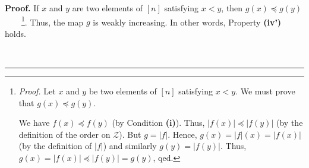 \documentclass[numbers=enddot,12pt,final,onecolumn,notitlepage]{scrartcl}%
\theoremstyle{definition}
\newenvironment{proof}[1][Proof]{\noindent\textbf{#1.} }{\ \rule{0.5em}{0.5em}}
\newenvironment{verlong}{}{}
\begin{document}
\begin{verlong}
\begin{proof}
If $x$ and $y$ are two elements of $\left[  n\right]  $ satisfying $x<y$, then
$g\left(  x\right)  \preccurlyeq g\left(  y\right)  $%
\ \ \ \ \footnote{\textit{Proof.} Let $x$ and $y$ be two elements of $\left[
n\right]  $ satisfying $x<y$. We must prove that $g\left(  x\right)
\preccurlyeq g\left(  y\right)  $.
\par
We have $f\left(  x\right)  \preccurlyeq f\left(  y\right)  $ (by Condition
\textbf{(i)}). Thus, $\left\vert f\left(  x\right)  \right\vert \preccurlyeq
\left\vert f\left(  y\right)  \right\vert $ (by the definition of the order on
$\mathcal{Z}$). But $g=\left\vert f\right\vert $. Hence, $g\left(  x\right)
=\left\vert f\right\vert \left(  x\right)  =\left\vert f\left(  x\right)
\right\vert $ (by the definition of $\left\vert f\right\vert $) and similarly
$g\left(  y\right)  =\left\vert f\left(  y\right)  \right\vert $. Thus,
$g\left(  x\right)  =\left\vert f\left(  x\right)  \right\vert \preccurlyeq
\left\vert f\left(  y\right)  \right\vert =g\left(  y\right)  $, qed.}. Thus,
the map $g$ is weakly increasing. In other words, Property \textbf{(iv')} holds.


\end{proof}
\end{verlong}
\end{document}
